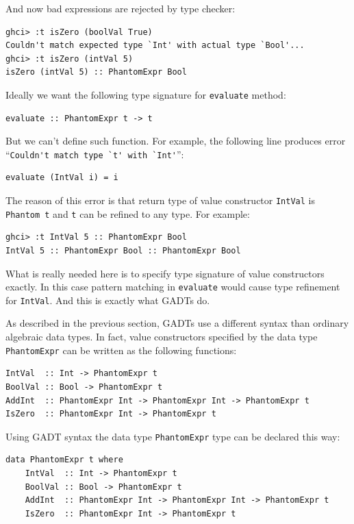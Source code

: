 \documentclass{tmr}
\begin{document}
And now bad expressions are rejected by type checker:

\begin{Verbatim}
ghci> :t isZero (boolVal True)
Couldn't match expected type `Int' with actual type `Bool'...
ghci> :t isZero (intVal 5)
isZero (intVal 5) :: PhantomExpr Bool
\end{Verbatim}

Ideally we want the following type signature for \verb|evaluate| method:

\begin{Verbatim}
evaluate :: PhantomExpr t -> t
\end{Verbatim}

But we can't define such function. For example, the following line produces error ``\verb|Couldn't match type `t' with `Int'|'':

\begin{Verbatim}
evaluate (IntVal i) = i
\end{Verbatim}

The reason of this error is that return type of value constructor \verb|IntVal| is \verb|Phantom t| and \verb|t| can be refined to any type. For example:

\begin{Verbatim}
ghci> :t IntVal 5 :: PhantomExpr Bool
IntVal 5 :: PhantomExpr Bool :: PhantomExpr Bool
\end{Verbatim}

What is really needed here is to specify type signature of value constructors exactly. In this case pattern matching in \verb|evaluate| would cause type refinement for \verb|IntVal|. And this is exactly what GADTs do.

As described in the previous section, GADTs use a different syntax than ordinary algebraic data types. In fact, value constructors specified by the data type \verb|PhantomExpr| can be written as the following functions:

\begin{Verbatim}
IntVal  :: Int -> PhantomExpr t
BoolVal :: Bool -> PhantomExpr t
AddInt  :: PhantomExpr Int -> PhantomExpr Int -> PhantomExpr t
IsZero  :: PhantomExpr Int -> PhantomExpr t
\end{Verbatim}

Using GADT syntax the data type \verb|PhantomExpr| type can be declared this way:

\begin{Verbatim}
data PhantomExpr t where
    IntVal  :: Int -> PhantomExpr t
    BoolVal :: Bool -> PhantomExpr t
    AddInt  :: PhantomExpr Int -> PhantomExpr Int -> PhantomExpr t
    IsZero  :: PhantomExpr Int -> PhantomExpr t
\end{Verbatim}
\end{document}
